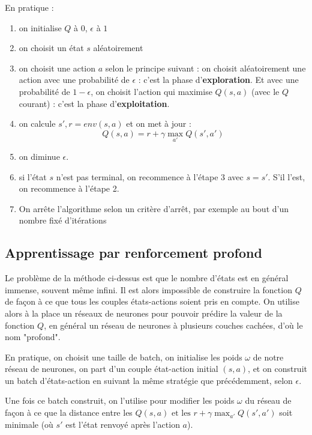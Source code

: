 En pratique : \begin{enumerate}

\item on initialise $Q$ à $0$, $\epsilon$ à $1$

\item on choisit un état $s$ aléatoirement

\item on choisit une action $a$ selon le principe suivant : on choisit aléatoirement une action avec une probabilité de $\epsilon$ : c'est la phase d'\textbf{exploration}. Et avec une probabilité de $1-\epsilon$, on choisit l'action qui maximise $Q(s,a)$ (avec le $Q$ courant) : c'est la phase d'\textbf{exploitation}.

\item on calcule $s', r = env(s, a)$ et on met à jour : $$ 
Q(s,a) = r + \gamma \max_{a'} Q(s',a')
$$

\item on diminue $\epsilon$.

\item si l'état $s$ n'est pas terminal, on recommence à l'étape 3 avec $s=s'$. S'il l'est, on recommence à l'étape 2. 

\item On arrête l'algorithme selon un critère d'arrêt, par exemple au bout d'un nombre fixé d'itérations

\end{enumerate} 

\subsection{Apprentissage par renforcement profond}

Le problème de la méthode ci-dessus est que le nombre d'états est en général immense, souvent même infini. Il est alors impossible de construire la fonction $Q$ de façon à ce que tous les couples états-actions soient pris en compte. On utilise alors à la place un réseaux de neurones pour pouvoir prédire la valeur de la fonction $Q$, en général un réseau de neurones à plusieurs couches cachées, d'où le nom "profond".

En pratique, on choisit une taille de batch, on initialise les poids $\omega$ de notre réseau de neurones, on part d'un couple état-action initial $(s,a)$, et on construit un batch d'états-action en suivant la même stratégie que précédemment, selon $\epsilon$. 

Une fois ce batch construit, on l'utilise pour modifier les poids $\omega$ du réseau de façon à ce que la distance entre les $
Q(s,a) \text{ et les } r + \gamma \max_{a'} Q(s',a')$ soit minimale (où $s'$ est l'état renvoyé après l'action $a$).

